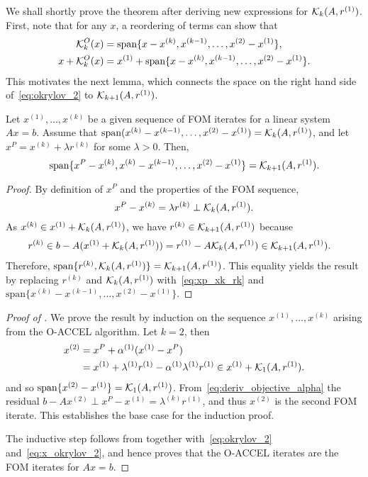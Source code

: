 \documentclass[main.tex]{subfiles}
\begin{document}
We shall shortly prove the theorem after deriving new expressions for
$\mathcal{K}_{k}(A,r^{(1)})$.  First, note that for any $x$, a reordering of terms can
show that
\begin{align}\label{eq:okrylov_2}
  \mathcal{K}_{k}^O(x)
  &=
    \mbox{span}\{x-x^{(k)},x^{(k-1)},\dots,x^{(2)}-x^{(1)}\},\\
  x+\mathcal{K}_{k}^O(x)
  &= x^{(1)} +
    \mbox{span}\{x-x^{(k)},x^{(k-1)},\dots,x^{(2)}-x^{(1)}\}.
    \label{eq:x_okrylov_2}
\end{align}
This motivates the next lemma, which connects the space on the right
hand side of~\eqref{eq:okrylov_2} to $\mathcal{K}_{k+1}(A,r^{(1)})$.
\begin{lemma}\label{lem:fom_xp}
  Let $x^{(1)},\dots,x^{(k)}$ be a given sequence of FOM iterates for
  a linear system $Ax=b$.  Assume that
  $\mbox{span}(x^{(k)}-x^{(k-1)},\dots,x^{(2)}-x^{(1)})=\mathcal{K}_{k}(A,r^{(1)})$,
  and let $x^P = x^{(k)}+\lambda r^{(k)}$ for some $\lambda>0$.  Then,
  \begin{equation}
    \mbox{span}\{x^P-x^{(k)},x^{(k)}-x^{(k-1)},\dots,x^{(2)}-x^{(1)}\}
    = \mathcal{K}_{k+1}(A,r^{(1)}).
  \end{equation}
\end{lemma}
\begin{proof}
  By definition of $x^P$ and the properties of the FOM sequence,
  \begin{equation}\label{eq:xp_xk_rk}
    x^{P}-x^{(k)} = \lambda r^{(k)}\perp \mathcal{K}_{k}(A,r^{(1)}).
  \end{equation}
  As $x^{(k)}\in x^{(1)}+\mathcal{K}_{k}(A,r^{(1)})$, we have $r^{(k)}\in\mathcal{K}_{k+1}(A,r^{(1)})$
  because
  \begin{align}
    r^{(k)} &\in b - A(x^{(1)} +\mathcal{K}_{k}(A,r^{(1)}))
              = r^{(1)} - A\mathcal{K}_{k}(A,r^{(1)})
              \in \mathcal{K}_{k+1}(A,r^{(1)}).
  \end{align}
  Therefore, $\mbox{span}\{r^{(k)},\mathcal{K}_{k}(A,r^{(1)})\}=\mathcal{K}_{k+1}(A,r^{(1)})$.  This
  equality yields the result by replacing $r^{(k)}$ and $\mathcal{K}_{k}(A,r^{(1)})$
  with~\eqref{eq:xp_xk_rk} and
  $\mbox{span}\{x^{(k)}-x^{(k-1)},\dots,x^{(2)}-x^{(1)}\}$.
\end{proof}

\begin{proof}[Proof of ]
  We prove the result by induction on the sequence
  $x^{(1)},\dots,x^{(k)}$ arising from the O-ACCEL algorithm.  Let
  $k=2$, then
  \begin{align}
    x^{(2)}
    &= x^P + \alpha^{(1)}(x^{(1)}-x^P)\\
    &= x^{(1)} + \lambda^{(1)}r^{(1)} -
      \alpha^{(1)}\lambda^{(1)}r^{(1)}
      \in x^{(1)} + \mathcal{K}_{1}(A,r^{(1)}).
  \end{align}
  and so $\mbox{span}\{x^{(2)}-x^{(1)}\} = \mathcal{K}_{1}(A,r^{(1)})$.
  From~\eqref{eq:deriv_objective_alpha} the residual
  $b-Ax^{(2)}\perp x^P-x^{(1)} = \lambda^{(k)}r^{(1)}$, and thus
  $x^{(2)}$ is the second FOM iterate. This establishes the base case
  for the induction proof.

  The inductive step follows from  together
  with~\eqref{eq:okrylov_2} and~\eqref{eq:x_okrylov_2}, and hence
  proves that the O-ACCEL iterates are the FOM iterates for $Ax=b$.
\end{proof}
\end{document}
